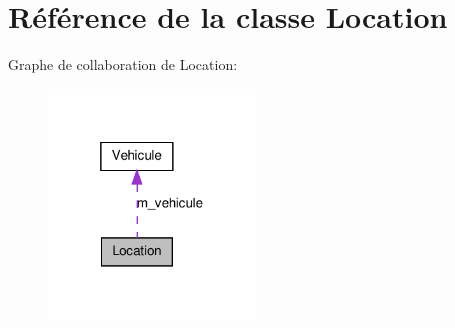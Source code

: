 \hypertarget{class_location}{
\section{Référence de la classe Location}
\label{class_location}
}


Graphe de collaboration de Location:\nopagebreak
\begin{figure}[H]
\begin{center}
\leavevmode
\includegraphics[width=157pt]{class_location__coll__graph}
\end{center}
\end{figure}
